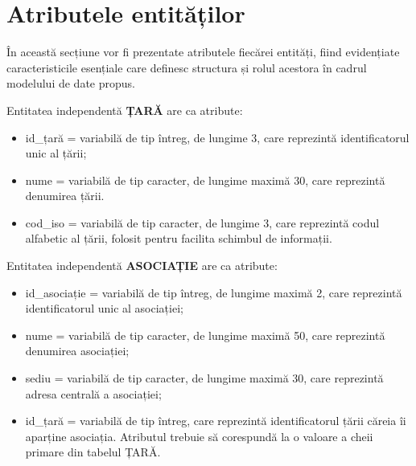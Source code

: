 \documentclass{article}
\begin{document}
	\newpage
	
	\section{Atributele entităților}
	\vspace{0.12cm}
	În această secțiune vor fi prezentate atributele fiecărei entități, fiind evidențiate caracteristicile esențiale care definesc structura și rolul acestora în cadrul modelului de date propus. 
	
	\vspace{0.7cm}
	
	\begin{spacing}{1.1}
		
	Entitatea independentă \textbf{ȚARĂ} are ca atribute:
	 
	\renewcommand{\labelitemi}{$\star$}
	
	\begin{itemize}
		\item id\_țară = variabilă de tip întreg, de lungime 3, care reprezintă identificatorul unic al țării;
		\item nume = variabilă de tip caracter, de lungime maximă 30, care reprezintă denumirea țării.
		\item cod\_iso = variabilă de tip caracter, de lungime 3, care reprezintă codul alfabetic al țării, folosit pentru facilita schimbul de informații.
	\end{itemize}
	
	\vspace{0.3cm}
	
	Entitatea independentă \textbf{ASOCIAȚIE} are ca atribute:
	
	\begin{itemize}
		\item id\_asociație = variabilă de tip întreg, de lungime maximă 2, care reprezintă identificatorul unic al asociației;
		
		\item nume = variabilă de tip caracter, de lungime maximă 50, care reprezintă denumirea asociației;
		
		\item sediu = variabilă de tip caracter, de lungime maximă 30, care reprezintă adresa centrală a asociației;
		
		\item id\_țară = variabilă de tip întreg, care reprezintă identificatorul țării căreia îi aparține asociația. Atributul trebuie să corespundă la o valoare a cheii primare din tabelul ȚARĂ.
	\end{itemize}
	

\end{spacing}
\end{document}
